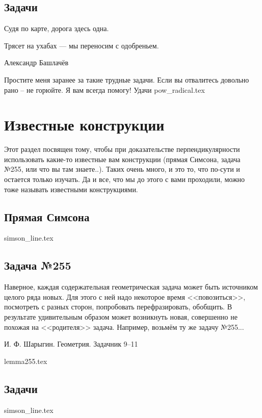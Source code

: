 \documentclass[twoside]{article}
\begin{document}
\subsection*{Задачи}
\epigraph{Судя по карте, дорога здесь одна.

Трясет на ухабах — мы переносим с одобреньем.}{Александр Башлачёв}
\noindent Простите меня заранее за такие трудные задачи. Если вы отвалитесь довольно рано -- не горюйте. Я вам всегда помогу! Удачи {\color{red}{$\heartsuit$}}
{pow_radical.tex}


\section{Известные конструкции}

Этот раздел посвящен тому, чтобы при доказательстве пер\-пен\-ди\-ку\-ляр\-нос\-ти использовать какие-то известные вам конструкции (прямая Симсона, задача №255, или что вы там знаете..). Таких очень много, и это то, что по-сути и остается только изучать. Да и все, что мы до этого с вами проходили, можно тоже называть известными конструкциями.

\subsection{Прямая Симсона}
{simson_line.tex}

\subsection{Задача №255}
\setlength{\epigraphwidth}{0.8\linewidth}\epigraph{Наверное, каждая содержательная геометрическая задача может быть источником целого ряда новых. Для этого с ней надо некоторое время <<повозиться>>, посмотреть с разных сторон, попробовать перефразировать, обобщить. В результате удивительным образом может возникнуть новая, совершенно не похожая на <<родителя>> задача. Например, возьмём ту же задачу №255...}{И. Ф. Шарыгин. Геометрия. Задачник 9–11}

{lemma255.tex}

\subsection*{Задачи}
{simson_line.tex}

\end{document}
